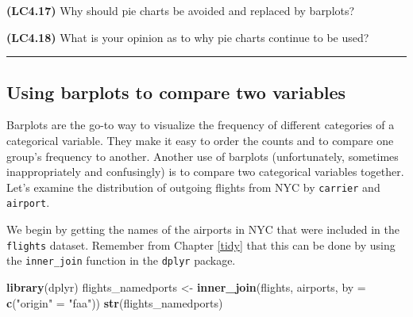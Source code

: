 \documentclass[]{tufte-book}
\newenvironment{Shaded}{\begin{snugshade}}{\end{snugshade}}
\newcommand{\KeywordTok}[1]{\textcolor[rgb]{0.13,0.29,0.53}{\textbf{{#1}}}}
\newcommand{\DataTypeTok}[1]{\textcolor[rgb]{0.13,0.29,0.53}{{#1}}}
\newcommand{\StringTok}[1]{\textcolor[rgb]{0.31,0.60,0.02}{{#1}}}
\newcommand{\NormalTok}[1]{{#1}}
\begin{document}
\textbf{(LC4.17)} Why should pie charts be avoided and replaced by
barplots?

\textbf{(LC4.18)} What is your opinion as to why pie charts continue to
be used?

\begin{center}\rule{0.5\linewidth}{\linethickness}\end{center}

\subsection{Using barplots to compare two
variables}\label{using-barplots-to-compare-two-variables}

Barplots are the go-to way to visualize the frequency of different
categories of a categorical variable. They make it easy to order the
counts and to compare one group's frequency to another. Another use of
barplots (unfortunately, sometimes inappropriately and confusingly) is
to compare two categorical variables together. Let's examine the
distribution of outgoing flights from NYC by \texttt{carrier} and
\texttt{airport}.

We begin by getting the names of the airports in NYC that were included
in the \texttt{flights} dataset. Remember from Chapter \ref{tidy} that
this can be done by using the \texttt{inner\_join} function in the
\texttt{dplyr} package.

\begin{Shaded}
\begin{Highlighting}[]
\KeywordTok{library}\NormalTok{(dplyr)}
\NormalTok{flights_namedports <-}\StringTok{ }\KeywordTok{inner_join}\NormalTok{(flights, airports, }\DataTypeTok{by =} \KeywordTok{c}\NormalTok{(}\StringTok{"origin"} \NormalTok{=}\StringTok{ "faa"}\NormalTok{))}
\KeywordTok{str}\NormalTok{(flights_namedports)}
\end{Highlighting}
\end{Shaded}
\end{document}
